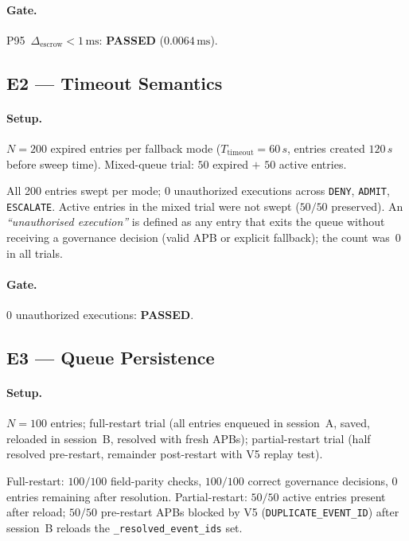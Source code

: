 \documentclass[11pt]{article}
\newcommand{\DENY}{\texttt{DENY}}
\newcommand{\ADMIT}{\texttt{ADMIT}}
\newcommand{\ESCALATE}{\texttt{ESCALATE}}
\newcommand{\Ttimeout}{T_{\mathrm{timeout}}}
\newcommand{\Drescrow}{\Delta_{\mathrm{escrow}}}
\begin{document}
\paragraph{Gate.} P95~$\Drescrow < 1\,\si{\milli\second}$:
\textbf{PASSED} ($0.0064\,\si{\milli\second}$).

\subsection{E2 --- Timeout Semantics}

\paragraph{Setup.}
$N=200$ expired entries per fallback mode
($\Ttimeout=60\,\si{s}$, entries created $120\,\si{s}$ before
sweep time). Mixed-queue trial: $50$ expired $+$ $50$ active entries.

All 200 entries swept per mode; 0 unauthorized executions across
\DENY, \ADMIT, \ESCALATE. Active entries in the mixed trial were
not swept ($50/50$ preserved). An \emph{``unauthorised execution''}
is defined as any entry that exits the queue without receiving a
governance decision (valid APB or explicit fallback); the count was~$0$
in all trials.

\paragraph{Gate.} $0$ unauthorized executions: \textbf{PASSED}.

\subsection{E3 --- Queue Persistence}

\paragraph{Setup.}
$N=100$ entries; full-restart trial (all entries enqueued in session~A,
saved, reloaded in session~B, resolved with fresh APBs); partial-restart
trial (half resolved pre-restart, remainder post-restart with V5 replay
test).

Full-restart: $100/100$ field-parity checks, $100/100$ correct
governance decisions, $0$ entries remaining after resolution.
Partial-restart: $50/50$ active entries present after reload;
$50/50$ pre-restart APBs blocked by V5
(\texttt{DUPLICATE\_EVENT\_ID}) after session~B reloads the
\texttt{\_resolved\_event\_ids} set.
\end{document}
